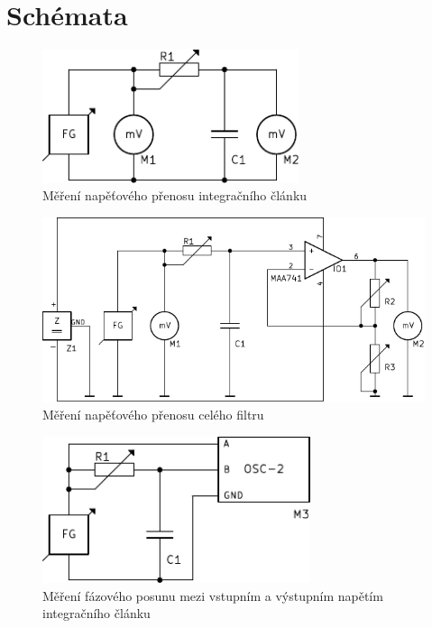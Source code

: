 \section*{Schémata}
  \begin{figure}[H]
    \centering
    \includegraphics[width=7.5057cm]{../img/RC_au.pdf}
    \caption{Měření napěťového přenosu integračního článku}
    \label{sch:1}
  \end{figure}
  
  \begin{figure}[H]
    \centering
    \includegraphics[width=15.5448cm]{../img/RC_OZ_au.pdf}
    \caption{Měření napěťového přenosu celého filtru}
    \label{sch:2}
  \end{figure}
  
  \begin{figure}[H]
    \centering
    \includegraphics[width=7.8486cm]{../img/RC_phi.pdf}
    \caption{Měření fázového posunu mezi vstupním a výstupním napětím integračního článku}
    \label{sch:3}
  \end{figure}
  
